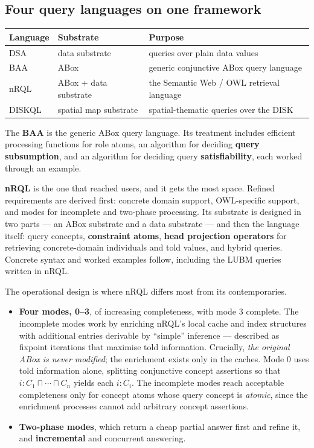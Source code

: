 \documentclass[11pt,a4paper,DIV=12,parskip=half]{scrartcl}
\begin{document}
\subsection{Four query languages on one framework}

\begin{center}
\small
\begin{tabular}{@{}lll@{}}
\toprule
\textbf{Language} & \textbf{Substrate} & \textbf{Purpose} \\
\midrule
DSA    & data substrate        & queries over plain data values \\
BAA    & ABox                  & generic conjunctive ABox query language \\
nRQL   & ABox + data substrate & the Semantic Web / OWL retrieval language \\
DISKQL & spatial map substrate & spatial-thematic queries over the DISK \\
\bottomrule
\end{tabular}
\end{center}

The \textbf{BAA} is the generic ABox query language. Its treatment includes
efficient processing functions for role atoms, an algorithm for deciding
\textbf{query subsumption}, and an algorithm for deciding query
\textbf{satisfiability}, each worked through an example.

\textbf{nRQL} is the one that reached users, and it gets the most space. Refined
requirements are derived first: concrete domain support, OWL-specific support,
and modes for incomplete and two-phase processing. Its substrate is designed in
two parts --- an ABox substrate and a data substrate --- and then the language
itself: query concepts, \textbf{constraint atoms}, \textbf{head projection
operators} for retrieving concrete-domain individuals and told values, and
hybrid queries. Concrete syntax and worked examples follow, including the LUBM
queries written in nRQL.

The operational design is where nRQL differs most from its contemporaries.

\begin{itemize}
\item \textbf{Four modes, 0--3}, of increasing completeness, with mode 3
  complete. The incomplete modes work by enriching nRQL's local cache and index
  structures with additional entries derivable by \enquote{simple} inference ---
  described as fixpoint iterations that maximise told information. Crucially,
  \emph{the original ABox is never modified}; the enrichment exists only in the
  caches. Mode 0 uses told information alone, splitting conjunctive concept
  assertions so that $i : C_1 \sqcap \cdots \sqcap C_n$ yields each $i : C_i$.
  The incomplete modes reach acceptable completeness only for concept atoms
  whose query concept is \emph{atomic}, since the enrichment processes cannot add
  arbitrary concept assertions.
\item \textbf{Two-phase modes}, which return a cheap partial answer first and
  refine it, and \textbf{incremental} and concurrent answering.
\end{itemize}
\end{document}
